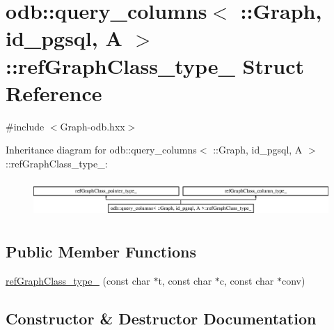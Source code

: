 \hypertarget{structodb_1_1query__columns_3_01_1_1_graph_00_01id__pgsql_00_01_a_01_4_1_1ref_graph_class__type__}{}\section{odb\+:\+:query\+\_\+columns$<$ \+:\+:Graph, id\+\_\+pgsql, A $>$\+:\+:ref\+Graph\+Class\+\_\+type\+\_\+ Struct Reference}
\label{structodb_1_1query__columns_3_01_1_1_graph_00_01id__pgsql_00_01_a_01_4_1_1ref_graph_class__type__}


{\ttfamily \#include $<$Graph-\/odb.\+hxx$>$}

Inheritance diagram for odb\+:\+:query\+\_\+columns$<$ \+:\+:Graph, id\+\_\+pgsql, A $>$\+:\+:ref\+Graph\+Class\+\_\+type\+\_\+\+:\begin{figure}[H]
\begin{center}
\leavevmode
\includegraphics[height=1.414141cm]{dc/d64/structodb_1_1query__columns_3_01_1_1_graph_00_01id__pgsql_00_01_a_01_4_1_1ref_graph_class__type__}
\end{center}
\end{figure}
\subsection*{Public Member Functions}
\begin{DoxyCompactItemize}
\item 
\hyperlink{structodb_1_1query__columns_3_01_1_1_graph_00_01id__pgsql_00_01_a_01_4_1_1ref_graph_class__type___a06a60f8306b6ec41f9d04c780f6b1054}{ref\+Graph\+Class\+\_\+type\+\_\+} (const char $\ast$t, const char $\ast$c, const char $\ast$conv)
\end{DoxyCompactItemize}


\subsection{Constructor \& Destructor Documentation}
\hypertarget{structodb_1_1query__columns_3_01_1_1_graph_00_01id__pgsql_00_01_a_01_4_1_1ref_graph_class__type___a06a60f8306b6ec41f9d04c780f6b1054}{}
